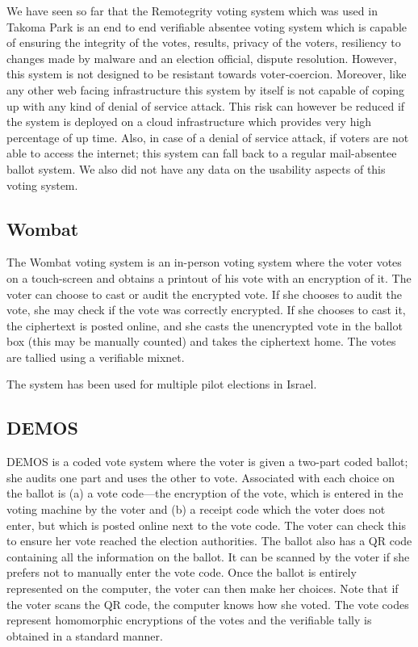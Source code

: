 We have seen so far that the Remotegrity voting system which was used
in Takoma Park is an end to end verifiable absentee voting system
which is capable of ensuring the integrity of the votes, results,
privacy of the voters, resiliency to changes made by malware and an
election official, dispute resolution. However, this system is not
designed to be resistant towards voter-coercion. Moreover, like any
other web facing infrastructure this system by itself is not capable
of coping up with any kind of denial of service attack. This risk can
however be reduced if the system is deployed on a cloud infrastructure
which provides very high percentage of up time. Also, in case of a
denial of service attack, if voters are not able to access the
internet; this system can fall back to a regular mail-absentee ballot
system. We also did not have any data on the usability aspects of this
voting system.

\subsection{Wombat~\cite{rosen2011}}

The Wombat voting system is an in-person voting system where the voter
votes on a touch-screen and obtains a printout of his vote with an
encryption of it. The voter can choose to cast or audit the encrypted
vote. If she chooses to audit the vote, she may check if the vote was
correctly encrypted. If she chooses to cast it, the ciphertext is
posted online, and she casts the unencrypted vote in the ballot box
(this may be manually counted) and takes the ciphertext home. The
votes are tallied using a verifiable mixnet.

The system has been used for multiple pilot elections in Israel.

\subsection{DEMOS~\cite{kiayias2014}}

DEMOS is a coded vote system where the voter is given a two-part coded
ballot; she audits one part and uses the other to vote. Associated
with each choice on the ballot is (a) a vote code---the encryption of
the vote, which is entered in the voting machine by the voter and (b)
a receipt code which the voter does not enter, but which is posted
online next to the vote code. The voter can check this to ensure her
vote reached the election authorities. The ballot also has a QR code
containing all the information on the ballot. It can be scanned by the
voter if she prefers not to manually enter the vote code. Once the
ballot is entirely represented on the computer, the voter can then
make her choices. Note that if the voter scans the QR code, the
computer knows how she voted. The vote codes represent homomorphic
encryptions of the votes and the verifiable tally is obtained in a
standard manner.


